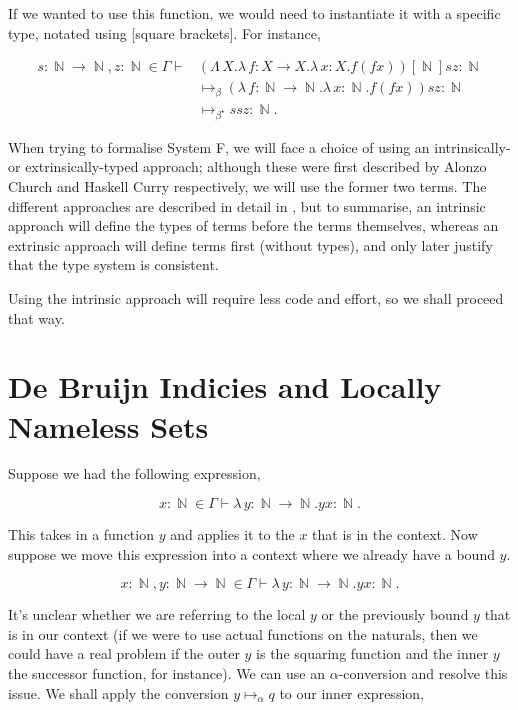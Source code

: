\documentclass[logo,bsc,singlespacing,parskip,online]{infthesis}
\DeclareMathOperator{\nat}{\mathbb{N}}
\begin{document}
If we wanted to use this function, we would need to instantiate it with a
specific type, notated using [square brackets]. For instance,

\begin{align*}
  s \colon \nat \to \nat, z \colon \nat \in \Gamma \vdash &(\Lambda \, X. \lambda \, f \colon X \to X . \lambda \, x \colon X . f (f x))[\nat] s z \colon \nat\\
  &\mapsto_{\beta} (\lambda \, f \colon \nat \to \nat . \lambda \, x \colon \nat . f (f x)) s z \colon \nat\\
  &\mapsto_{\beta^{\star}} s s z \colon \nat.
\end{align*}

When trying to formalise System F, we will face a choice of using an
intrinsically- or extrinsically-typed approach; although these were first
described by Alonzo Church and Haskell Curry respectively, we will use the
former two terms. The different approaches are described in detail in
\citet{gries_what_2003}, but to summarise, an intrinsic approach will define the
types of terms before the terms themselves, whereas an extrinsic approach will
define terms first (without types), and only later justify that the type system
is consistent.

Using the intrinsic approach will require less code and effort, so we shall
proceed that way.

\section{De Bruijn Indicies and Locally Nameless Sets}

Suppose we had the following expression,

\begin{equation*}
  x \colon \nat \in \Gamma \vdash \lambda \, y \colon \nat \to \nat. y x \colon \nat.
\end{equation*}

This takes in a function $y$ and applies it to the $x$ that is in the context.
Now suppose we move this expression into a context where we already have a bound
$y$.

\begin{equation*}
  x \colon \nat, y \colon \nat \to \nat \in \Gamma \vdash \lambda \, y \colon \nat \to \nat. y x \colon \nat.
\end{equation*}

It's unclear whether we are referring to the local $y$ or the previously bound
$y$ that is in our context (if we were to use actual functions on the naturals,
then we could have a real problem if the outer $y$ is the squaring function and
the inner $y$ the successor function, for instance). We can use an
$\alpha$-conversion and resolve this issue. We shall apply the conversion $y
\mapsto_{\alpha} q$ to our inner expression,
\end{document}
